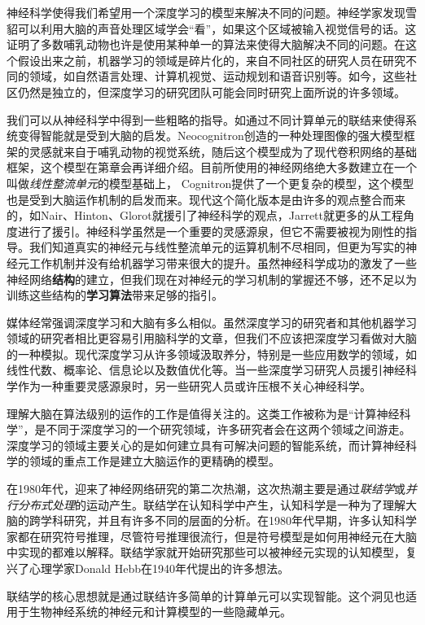 神经科学使得我们希望用一个深度学习的模型来解决不同的问题。神经学家发现雪貂可以利用大脑的声音处理区域学会“看”，如果这个区域被输入视觉信号的话。这证明了多数哺乳动物也许是使用某种单一的算法来使得大脑解决不同的问题。在这个假设出来之前，机器学习的领域是碎片化的，来自不同社区的研究人员在研究不同的领域，如自然语言处理、计算机视觉、运动规划和语音识别等。如今，这些社区仍然是独立的，但深度学习的研究团队可能会同时研究上面所说的许多领域。


我们可以从神经科学中得到一些粗略的指导。如通过不同计算单元的联结来使得系统变得智能就是受到大脑的启发。Neocognitron创造的一种处理图像的强大模型框架的灵感就来自于哺乳动物的视觉系统，随后这个模型成为了现代卷积网络的基础框架，这个模型在第章会再详细介绍。目前所使用的神经网络绝大多数建立在一个叫做\emph{线性整流单元}的模型基础上， Cognitron提供了一个更复杂的模型，这个模型也是受到大脑运作机制的启发而来。现代这个简化版本是由许多的观点整合而来的，如Nair、Hinton、Glorot就援引了神经科学的观点，Jarrett就更多的从工程角度进行了援引。神经科学虽然是一个重要的灵感源泉，但它不需要被视为刚性的指导。我们知道真实的神经元与线性整流单元的运算机制不尽相同，但更为写实的神经元工作机制并没有给机器学习带来很大的提升。虽然神经科学成功的激发了一些神经网络\textbf{结构}的建立，但我们现在对神经元的学习机制的掌握还不够，还不足以为训练这些结构的\textbf{学习算法}带来足够的指引。


媒体经常强调深度学习和大脑有多么相似。虽然深度学习的研究者和其他机器学习领域的研究者相比更容易引用脑科学的文章，但我们不应该把深度学习看做对大脑的一种模拟。现代深度学习从许多领域汲取养分，特别是一些应用数学的领域，如线性代数、概率论、信息论以及数值优化等。当一些深度学习研究人员援引神经科学作为一种重要灵感源泉时，另一些研究人员或许压根不关心神经科学。


理解大脑在算法级别的运作的工作是值得关注的。这类工作被称为是“计算神经科学”，是不同于深度学习的一个研究领域，许多研究者会在这两个领域之间游走。深度学习的领域主要关心的是如何建立具有可解决问题的智能系统，而计算神经科学的领域的重点工作是建立大脑运作的更精确的模型。


在1980年代，迎来了神经网络研究的第二次热潮，这次热潮主要是通过\emph{联结学}或\emph{并行分布式处理}的运动产生。联结学在认知科学中产生，认知科学是一种为了理解大脑的跨学科研究，并且有许多不同的层面的分析。在1980年代早期，许多认知科学家都在研究符号推理，尽管符号推理很流行，但是符号模型是如何用神经元在大脑中实现的都难以解释。联结学家就开始研究那些可以被神经元实现的认知模型，复兴了心理学家Donald Hebb在1940年代提出的许多想法。


联结学的核心思想就是通过联结许多简单的计算单元可以实现智能。这个洞见也适用于生物神经系统的神经元和计算模型的一些隐藏单元。


